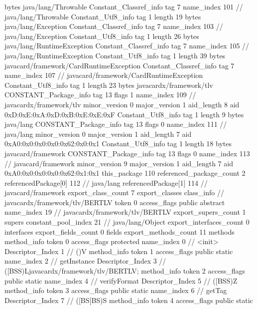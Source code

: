 {{{			bytes	java/lang/Throwable
		}
		Constant_Classref_info {
			tag	7
			name_index	101		// java/lang/Throwable
		}
		Constant_Utf8_info {
			tag	1
			length	19
			bytes	java/lang/Exception
		}
		Constant_Classref_info {
			tag	7
			name_index	103		// java/lang/Exception
		}
		Constant_Utf8_info {
			tag	1
			length	26
			bytes	java/lang/RuntimeException
		}
		Constant_Classref_info {
			tag	7
			name_index	105		// java/lang/RuntimeException
		}
		Constant_Utf8_info {
			tag	1
			length	39
			bytes	javacard/framework/CardRuntimeException
		}
		Constant_Classref_info {
			tag	7
			name_index	107		// javacard/framework/CardRuntimeException
		}
		Constant_Utf8_info {
			tag	1
			length	23
			bytes	javacardx/framework/tlv
		}
		CONSTANT_Package_info {
			tag	13
			flags	1
			name_index	109		// javacardx/framework/tlv
			minor_version	0
			major_version	1
			aid_length	8
			aid	0xD:0xE:0xA:0xD:0xB:0xE:0xE:0xF
		}
		Constant_Utf8_info {
			tag	1
			length	9
			bytes	java/lang
		}
		CONSTANT_Package_info {
			tag	13
			flags	0
			name_index	111		// java/lang
			minor_version	0
			major_version	1
			aid_length	7
			aid	0xA0:0x0:0x0:0x0:0x62:0x0:0x1
		}
		Constant_Utf8_info {
			tag	1
			length	18
			bytes	javacard/framework
		}
		CONSTANT_Package_info {
			tag	13
			flags	0
			name_index	113		// javacard/framework
			minor_version	9
			major_version	1
			aid_length	7
			aid	0xA0:0x0:0x0:0x0:0x62:0x1:0x1
		}
	}
	this_package	110
	referenced_package_count	2
	referencedPackage[0]	112		// java/lang
	referencedPackage[1]	114		// javacard/framework
	export_class_count	7
	export_classes {
		class_info {		// javacardx/framework/tlv/BERTLV
			token	0
			access_flags	public abstract
			name_index	19		// javacardx/framework/tlv/BERTLV
			export_supers_count	1
			supers {
				constant_pool_index	21		// java/lang/Object
			}
			export_interfaces_count	0
			interfaces {
			}
			export_fields_count	0
			fields {
			}
			export_methods_count	11
			methods {
				method_info {
					token	0
					access_flags	protected
					name_index	0		// <init>
					Descriptor_Index	1		// ()V
				}
				method_info {
					token	1
					access_flags	public static
					name_index	2		// getInstance
					Descriptor_Index	3		// ([BSS)Ljavacardx/framework/tlv/BERTLV;
				}
				method_info {
					token	2
					access_flags	public static
					name_index	4		// verifyFormat
					Descriptor_Index	5		// ([BSS)Z
				}
				method_info {
					token	3
					access_flags	public static
					name_index	6		// getTag
					Descriptor_Index	7		// ([BS[BS)S
				}
				method_info {
					token	4
					access_flags	public static
}}}}}
